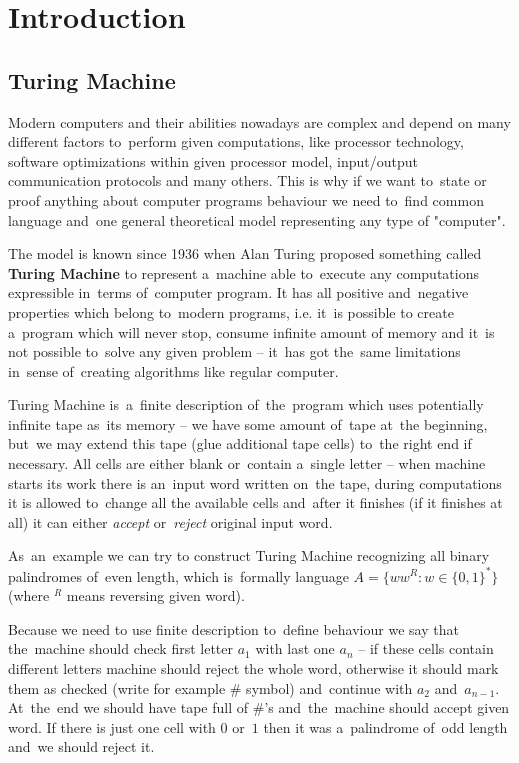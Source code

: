 \documentclass[english,shortabstract,mgr]{iithesis}
\author         {Jadwiga Pokorska}
\begin{document}

\chapter{Introduction}

\section{Turing Machine}

Modern computers and their abilities nowadays are complex and depend on many different factors
to~perform given computations, like processor technology, software optimizations within given
processor model, input/output communication protocols and many others. This is why if we want
to~state or proof anything about computer programs behaviour we need to~find common language
and~one general theoretical model representing any type of "computer".

The model is known since 1936 when Alan Turing proposed something called \textbf{Turing Machine}
to represent a~machine able to~execute any computations expressible in~terms of~computer program.
It has all positive and~negative properties which belong to~modern programs, i.e. it~is possible
to create a~program which will never stop, consume infinite amount of memory and it~is not possible
to~solve any given problem -- it~has got the~same limitations in~sense of~creating algorithms
like regular computer.

Turing Machine is~a~finite description of~the~program which uses potentially infinite tape
as~its memory -- we have some amount of~tape at~the beginning, but~we may extend this tape
(glue additional tape cells) to~the right end if necessary. All cells are either blank
or~contain a~single letter -- when machine starts its work there is an~input word
written on~the tape, during computations it is allowed to~change all the available
cells and~after it finishes (if it finishes at all) it can either \textit{accept}
or~\textit{reject} original input word.

As~an~example we can try to construct Turing Machine recognizing all binary palindromes of~even length,
which is~formally language $A = \{ ww^R : w \in \{0,1\}^* \}$ (where $^R$ means reversing given word).

Because we need to use finite description to~define behaviour we say that the~machine should
check first letter $a_1$ with last one $a_n$ -- if these cells contain different letters machine
should reject the whole word, otherwise it should mark them as checked (write for example $\#$ symbol)
and~continue with $a_2$ and~$a_{n-1}$. At~the~end we should have tape full of $\#$'s and~the~machine
should accept given word. If there is just one cell with $0$ or~$1$ then it was a~palindrome
of~odd length and~we should reject it.
\end{document}
